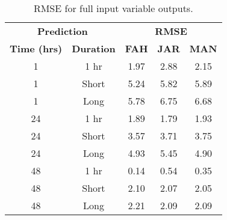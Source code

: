 \begin{table}[H]
\centering
\caption{RMSE for full input variable outputs.}
\label{tb:RMSEresults}
\begin{tabular}{@{}ccccc@{}}
\toprule
\multicolumn{2}{c}{\textbf{Prediction}} & \multicolumn{3}{c}{\textbf{RMSE}}          \\ 
\textbf{Time (hrs)} & \textbf{Duration} & \textbf{FAH} & \textbf{JAR} & \textbf{MAN} \\ \midrule
1                   & 1 hr              & 1.97         & 2.88         & 2.15         \\
1                   & Short             & 5.24         & 5.82         & 5.89         \\
1                   & Long              & 5.78         & 6.75         & 6.68         \\ \hline
24                  & 1 hr              & 1.89         & 1.79         & 1.93         \\
24                  & Short             & 3.57         & 3.71         & 3.75         \\
24                  & Long              & 4.93         & 5.45         & 4.90         \\ \hline
48                  & 1 hr              & 0.14         & 0.54         & 0.35         \\
48                  & Short             & 2.10         & 2.07         & 2.05         \\
48                  & Long              & 2.21         & 2.09         & 2.09         \\ \bottomrule
\end{tabular}
\end{table}